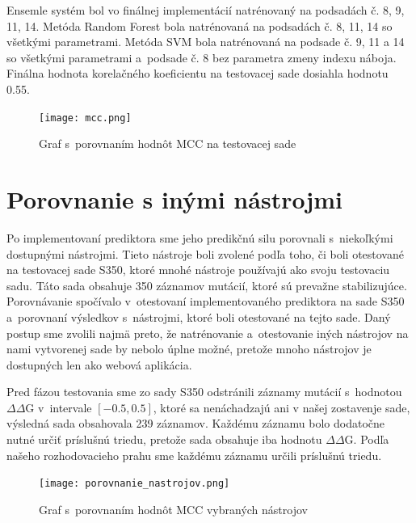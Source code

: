 Ensemle systém bol vo finálnej implementácií natrénovaný na podsadách č. 8, 9, 11, 14. Metóda Random Forest bola natrénovaná na podsadách č. 8, 11, 14 so všetkými parametrami. Metóda SVM bola natrénovaná na podsade č. 9, 11 a 14 so všetkými parametrami a~podsade č. 8 bez parametra zmeny indexu náboja. Finálna hodnota korelačného koeficientu na testovacej sade dosiahla hodnotu 0.55. 

\begin{figure}[H]
	\centering
	\begin{center}
		\scalebox{0.7}
		{   
			\texttt{[image: mcc.png]}
		}
		\caption{Graf s~porovnaním hodnôt MCC na testovacej sade}
	\end{center}
\end{figure}

\section{Porovnanie s inými nástrojmi}

Po implementovaní prediktora sme jeho predikčnú silu porovnali s~niekoľkými dostupnými nástrojmi. Tieto nástroje boli zvolené podľa toho, či boli otestované na testovacej sade S350, ktoré mnohé nástroje používajú ako svoju testovaciu sadu. Táto sada obsahuje 350 záznamov mutácií, ktoré sú prevažne stabilizujúce. 
Porovnávanie spočívalo v~otestovaní implementovaného prediktora na sade S350 a~porovnaní výsledkov s~nástrojmi, ktoré boli otestované na tejto sade. Daný postup sme zvolili najmä preto, že natrénovanie a~otestovanie iných nástrojov na nami vytvorenej sade by nebolo úplne možné, pretože mnoho nástrojov je dostupných len ako webová aplikácia.

Pred fázou testovania sme zo sady S350 odstránili záznamy mutácií s~hodnotou $\Delta\Delta$G v~intervale $\left[-0.5,0.5\right]$, ktoré sa nenáchadzajú ani v našej zostavenje sade, výsledná sada obsahovala 239 záznamov. Každému záznamu bolo dodatočne nutné určiť príslušnú triedu, pretože sada obsahuje iba hodnotu $\Delta\Delta$G. Podľa našeho rozhodovacieho prahu sme každému záznamu určili príslušnú triedu. 


\begin{figure}[H]
	\centering
	\begin{center}
		\scalebox{0.7}
		{   
			\texttt{[image: porovnanie\_nastrojov.png]}
		}
		\caption{Graf s~porovnaním hodnôt MCC vybraných nástrojov}
		\label{porovnanie}
	\end{center}
\end{figure}

